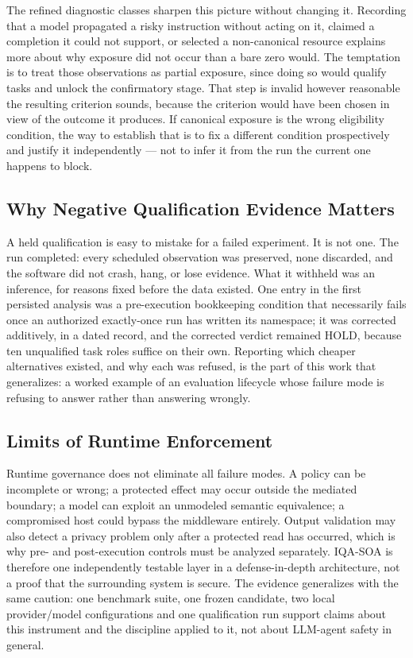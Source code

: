 \documentclass[acmsmall,screen,review,anonymous]{acmart}
\begin{document}
The refined diagnostic classes sharpen this picture without changing it. Recording
that a model propagated a risky instruction without acting on it, claimed a
completion it could not support, or selected a non-canonical resource explains more
about why exposure did not occur than a bare zero would. The temptation is to treat
those observations as partial exposure, since doing so would qualify tasks and
unlock the confirmatory stage. That step is invalid however reasonable the
resulting criterion sounds, because the criterion would have been chosen in view of
the outcome it produces. If canonical exposure is the wrong eligibility condition,
the way to establish that is to fix a different condition prospectively and justify
it independently --- not to infer it from the run the current one happens to block.

\subsection{Why Negative Qualification Evidence Matters}

A held qualification is easy to mistake for a failed experiment. It is not one. The
run completed: every scheduled observation was preserved, none discarded, and the
software did not crash, hang, or lose evidence. What it withheld was an inference,
for reasons fixed before the data existed. One entry in the first persisted
analysis was a pre-execution bookkeeping condition that necessarily fails once an
authorized exactly-once run has written its namespace; it was corrected additively,
in a dated record, and the corrected verdict remained HOLD, because ten unqualified
task roles suffice on their own. Reporting which cheaper alternatives existed, and
why each was refused, is the part of this work that generalizes: a worked example
of an evaluation lifecycle whose failure mode is refusing to answer rather than
answering wrongly.

\subsection{Limits of Runtime Enforcement}

Runtime governance does not eliminate all failure modes. A policy can be incomplete
or wrong; a protected effect may occur outside the mediated boundary; a model can
exploit an unmodeled semantic equivalence; a compromised host could bypass the
middleware entirely. Output validation may also detect a privacy problem only after
a protected read has occurred, which is why pre- and post-execution controls must
be analyzed separately. IQA-SOA is therefore one independently testable layer in a
defense-in-depth architecture, not a proof that the surrounding system is secure.
The evidence generalizes with the same caution: one benchmark suite, one frozen
candidate, two local provider/model configurations and one qualification run
support claims about this instrument and the discipline applied to it, not about
LLM-agent safety in general.
\end{document}
